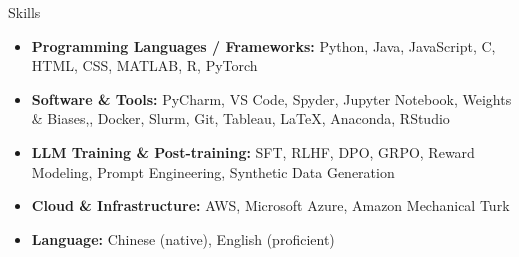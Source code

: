 \documentclass[a4paper, 12pt]{resume} %
\begin{document}



\begin{rSection}{Skills}
\begin{itemize}[noitemsep, topsep=0pt, leftmargin=*]
\item {\bf Programming Languages / Frameworks:} Python, Java, JavaScript, C, HTML, CSS, MATLAB, R, PyTorch
\item {\bf Software \& Tools:} PyCharm, VS Code, Spyder, Jupyter Notebook, Weights \& Biases,, Docker, Slurm, Git, Tableau, LaTeX, Anaconda, RStudio
\item {\bf LLM Training \& Post-training:} SFT, RLHF, DPO, GRPO, Reward Modeling, Prompt Engineering, Synthetic Data Generation
\item {\bf Cloud \& Infrastructure:} AWS, Microsoft Azure, Amazon Mechanical Turk
\item {\bf Language:} Chinese (native), English (proficient)

\end{itemize}
\end{rSection}
\end{document}
